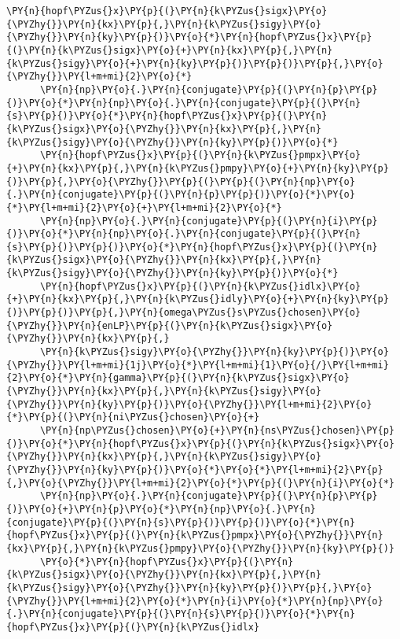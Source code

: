 \begin{Verbatim}[commandchars=\\\{\}]
      \PY{n}{hopf\PYZus{}x}\PY{p}{(}\PY{n}{k\PYZus{}sigx}\PY{o}{\PYZhy{}}\PY{n}{kx}\PY{p}{,}\PY{n}{k\PYZus{}sigy}\PY{o}{\PYZhy{}}\PY{n}{ky}\PY{p}{)}\PY{o}{*}\PY{n}{hopf\PYZus{}x}\PY{p}{(}\PY{n}{k\PYZus{}sigx}\PY{o}{+}\PY{n}{kx}\PY{p}{,}\PY{n}{k\PYZus{}sigy}\PY{o}{+}\PY{n}{ky}\PY{p}{)}\PY{p}{)}\PY{p}{,}\PY{o}{\PYZhy{}}\PY{l+m+mi}{2}\PY{o}{*}
      \PY{n}{np}\PY{o}{.}\PY{n}{conjugate}\PY{p}{(}\PY{n}{p}\PY{p}{)}\PY{o}{*}\PY{n}{np}\PY{o}{.}\PY{n}{conjugate}\PY{p}{(}\PY{n}{s}\PY{p}{)}\PY{o}{*}\PY{n}{hopf\PYZus{}x}\PY{p}{(}\PY{n}{k\PYZus{}sigx}\PY{o}{\PYZhy{}}\PY{n}{kx}\PY{p}{,}\PY{n}{k\PYZus{}sigy}\PY{o}{\PYZhy{}}\PY{n}{ky}\PY{p}{)}\PY{o}{*}
      \PY{n}{hopf\PYZus{}x}\PY{p}{(}\PY{n}{k\PYZus{}pmpx}\PY{o}{+}\PY{n}{kx}\PY{p}{,}\PY{n}{k\PYZus{}pmpy}\PY{o}{+}\PY{n}{ky}\PY{p}{)}\PY{p}{,}\PY{o}{\PYZhy{}}\PY{p}{(}\PY{p}{(}\PY{n}{np}\PY{o}{.}\PY{n}{conjugate}\PY{p}{(}\PY{n}{p}\PY{p}{)}\PY{o}{*}\PY{o}{*}\PY{l+m+mi}{2}\PY{o}{+}\PY{l+m+mi}{2}\PY{o}{*}
      \PY{n}{np}\PY{o}{.}\PY{n}{conjugate}\PY{p}{(}\PY{n}{i}\PY{p}{)}\PY{o}{*}\PY{n}{np}\PY{o}{.}\PY{n}{conjugate}\PY{p}{(}\PY{n}{s}\PY{p}{)}\PY{p}{)}\PY{o}{*}\PY{n}{hopf\PYZus{}x}\PY{p}{(}\PY{n}{k\PYZus{}sigx}\PY{o}{\PYZhy{}}\PY{n}{kx}\PY{p}{,}\PY{n}{k\PYZus{}sigy}\PY{o}{\PYZhy{}}\PY{n}{ky}\PY{p}{)}\PY{o}{*}
      \PY{n}{hopf\PYZus{}x}\PY{p}{(}\PY{n}{k\PYZus{}idlx}\PY{o}{+}\PY{n}{kx}\PY{p}{,}\PY{n}{k\PYZus{}idly}\PY{o}{+}\PY{n}{ky}\PY{p}{)}\PY{p}{)}\PY{p}{,}\PY{n}{omega\PYZus{}s\PYZus{}chosen}\PY{o}{\PYZhy{}}\PY{n}{enLP}\PY{p}{(}\PY{n}{k\PYZus{}sigx}\PY{o}{\PYZhy{}}\PY{n}{kx}\PY{p}{,}
      \PY{n}{k\PYZus{}sigy}\PY{o}{\PYZhy{}}\PY{n}{ky}\PY{p}{)}\PY{o}{\PYZhy{}}\PY{l+m+mi}{1j}\PY{o}{*}\PY{l+m+mi}{1}\PY{o}{/}\PY{l+m+mi}{2}\PY{o}{*}\PY{n}{gamma}\PY{p}{(}\PY{n}{k\PYZus{}sigx}\PY{o}{\PYZhy{}}\PY{n}{kx}\PY{p}{,}\PY{n}{k\PYZus{}sigy}\PY{o}{\PYZhy{}}\PY{n}{ky}\PY{p}{)}\PY{o}{\PYZhy{}}\PY{l+m+mi}{2}\PY{o}{*}\PY{p}{(}\PY{n}{ni\PYZus{}chosen}\PY{o}{+}
      \PY{n}{np\PYZus{}chosen}\PY{o}{+}\PY{n}{ns\PYZus{}chosen}\PY{p}{)}\PY{o}{*}\PY{n}{hopf\PYZus{}x}\PY{p}{(}\PY{n}{k\PYZus{}sigx}\PY{o}{\PYZhy{}}\PY{n}{kx}\PY{p}{,}\PY{n}{k\PYZus{}sigy}\PY{o}{\PYZhy{}}\PY{n}{ky}\PY{p}{)}\PY{o}{*}\PY{o}{*}\PY{l+m+mi}{2}\PY{p}{,}\PY{o}{\PYZhy{}}\PY{l+m+mi}{2}\PY{o}{*}\PY{p}{(}\PY{n}{i}\PY{o}{*}
      \PY{n}{np}\PY{o}{.}\PY{n}{conjugate}\PY{p}{(}\PY{n}{p}\PY{p}{)}\PY{o}{+}\PY{n}{p}\PY{o}{*}\PY{n}{np}\PY{o}{.}\PY{n}{conjugate}\PY{p}{(}\PY{n}{s}\PY{p}{)}\PY{p}{)}\PY{o}{*}\PY{n}{hopf\PYZus{}x}\PY{p}{(}\PY{n}{k\PYZus{}pmpx}\PY{o}{\PYZhy{}}\PY{n}{kx}\PY{p}{,}\PY{n}{k\PYZus{}pmpy}\PY{o}{\PYZhy{}}\PY{n}{ky}\PY{p}{)}
      \PY{o}{*}\PY{n}{hopf\PYZus{}x}\PY{p}{(}\PY{n}{k\PYZus{}sigx}\PY{o}{\PYZhy{}}\PY{n}{kx}\PY{p}{,}\PY{n}{k\PYZus{}sigy}\PY{o}{\PYZhy{}}\PY{n}{ky}\PY{p}{)}\PY{p}{,}\PY{o}{\PYZhy{}}\PY{l+m+mi}{2}\PY{o}{*}\PY{n}{i}\PY{o}{*}\PY{n}{np}\PY{o}{.}\PY{n}{conjugate}\PY{p}{(}\PY{n}{s}\PY{p}{)}\PY{o}{*}\PY{n}{hopf\PYZus{}x}\PY{p}{(}\PY{n}{k\PYZus{}idlx}

\end{Verbatim}
